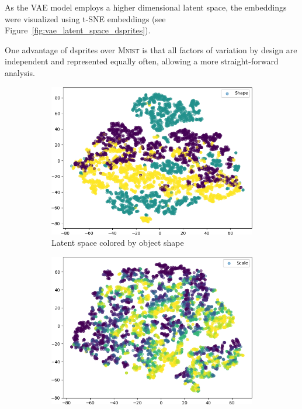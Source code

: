 As the \ac{VAE} model employs a higher dimensional latent space, the embeddings were visualized using t-SNE embeddings (see Figure~\ref{fig:vae_latent_space_dsprites}).

One advantage of dsprites over \textsc{Mnist} is that all factors of variation by design are independent and represented equally often, allowing a more straight-forward analysis.

\begin{figure}
    \centering
    \begin{subfigure}{.19\textwidth}
        \includegraphics[width=\textwidth]{images/latent_spaces/dsprites/vae/embeddings_mu_0.png}
        \caption{Latent space colored by object shape}
    \end{subfigure}
    \hfill
    \begin{subfigure}{.19\textwidth}
        \includegraphics[width=\textwidth]{images/latent_spaces/dsprites/vae/embeddings_mu_1.png}

\end{subfigure}
\end{figure}
